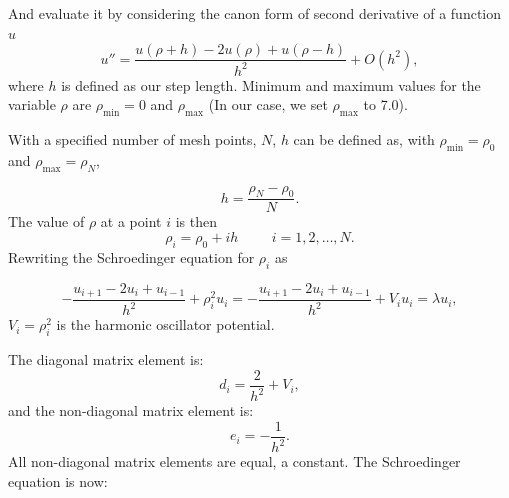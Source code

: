 \documentclass[%
reprint,
superscriptaddress,
showpacs,
nofootinbib,
bibnotes,amsmath,amssymb,aps,
prc, 
]{revtex4-1}
\begin{document}
And evaluate it by considering the canon form of second derivative of a function $u$
\begin{equation}
u''=\frac{u(\rho+h) -2u(\rho) +u(\rho-h)}{h^2} +O(h^2),
\label{eq:diffoperation}
\end{equation}
where $h$ is defined as our step length.
Minimum and maximum values for the variable $\rho$ are
$\rho_{\mathrm{min}}=0$  and $\rho_{\mathrm{max}}$
(In our case, we set $\rho_{\mathrm{max}}$ to 7.0).

With a specified number of mesh points, $N$, 
$h$ can be defined as, with $\rho_{\mathrm{min}}=\rho_0$  and $\rho_{\mathrm{max}}=\rho_N$,

\begin{equation*}
	h=\frac{\rho_N-\rho_0 }{N}.
\end{equation*}
The value of $\rho$ at a point $i$ is then 
\[
\rho_i= \rho_0 + ih \hspace{1cm} i=1,2,\dots , N.
\]
Rewriting the Schroedinger equation for $\rho_i$ as

\[
-\frac{u_{i+1} -2u_i +u_{i-1}}{h^2}+\rho_i^2u_i=-\frac{u_{i+1} -2u_i +u_{i-1} }{h^2}+V_iu_i  = \lambda u_i,
\]
$V_i=\rho_i^2$ is the harmonic oscillator potential.

The diagonal matrix element is:
\begin{equation*}
	d_i=\frac{2}{h^2}+V_i,
\end{equation*}
and the non-diagonal matrix element is:
\begin{equation*}
	e_i=-\frac{1}{h^2}.
\end{equation*}
All non-diagonal matrix elements are equal, a constant.
The Schroedinger equation is now:
\end{document}
